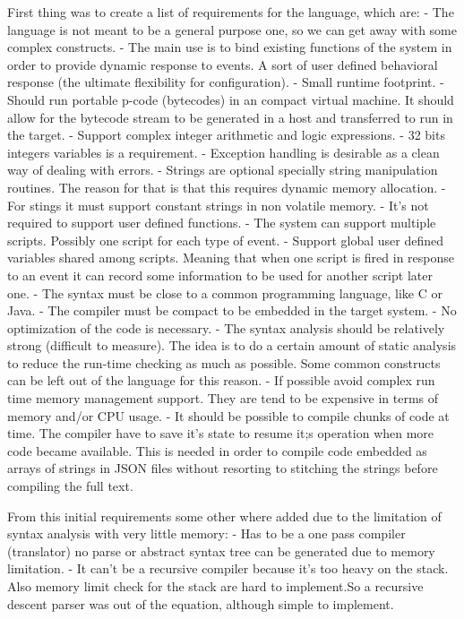 \documentclass[11pt]{article} %
\begin{document}
First thing was to create a list of requirements for the language, which are:
- The language is not meant to be a general purpose one, so we can get away with some complex constructs.
- The main use is to bind existing functions of the system in order to provide dynamic response to events. A sort of user defined behavioral response (the ultimate flexibility for configuration).
- Small runtime footprint.
- Should run portable p-code (bytecodes) in an compact virtual machine. It should allow for the bytecode stream to be generated in a host and transferred to run in the target.
- Support complex integer arithmetic and logic expressions.
- 32 bits integers variables is a requirement.
- Exception handling is desirable as a clean way of dealing with errors.
- Strings are optional specially string manipulation routines. The reason for that is that this requires dynamic memory allocation. 
- For stings it must support constant strings in non volatile memory.
- It's not required to support user defined functions.
- The system can support multiple scripts. Possibly one script for each type of event.
- Support global user defined variables shared among scripts. Meaning that when one script is fired in response to an event it can record some information to be used for another script later one.
- The syntax must be close to a common programming language, like C or Java.
- The compiler must be compact to be embedded in the target system.
- No optimization of the code is necessary.
- The syntax analysis should be relatively strong (difficult to measure). The idea is to do a certain amount of static analysis to reduce the run-time checking as much as possible. Some common constructs can be left out of the language for this reason.
- If possible avoid complex run time memory management support. They are tend to be expensive in terms of memory and/or CPU usage.
- It should be possible to compile chunks of code at time. The compiler have to save it's state to resume it;s operation when more code became available. This is needed in order to compile code embedded as arrays of strings in JSON files without resorting to stitching the strings before compiling the full text.

From this initial requirements some other where added due to the limitation of syntax analysis with very little memory:
- Has to be a one pass compiler (translator) no parse or abstract syntax tree can be generated due to memory limitation.
- It can't be a recursive compiler because it's too heavy on the stack. Also memory limit check for the stack are hard to implement.So a recursive descent parser was out of the equation, although simple to implement.
\end{document}
